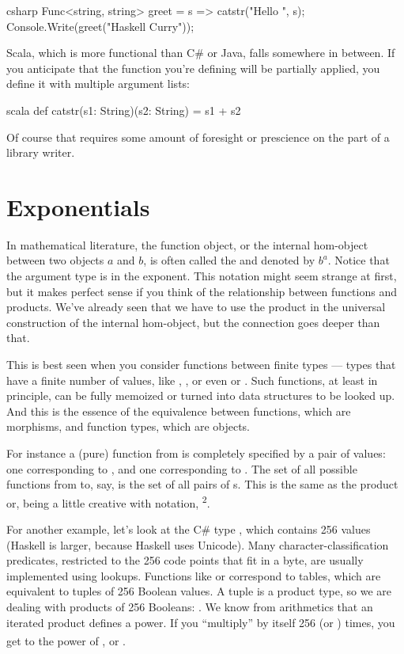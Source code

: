 \begin{snip}{csharp}
Func<string, string> greet = s => catstr("Hello ", s);
Console.Write(greet("Haskell Curry"));
\end{snip}
Scala, which is more functional than C\# or Java, falls somewhere in
between. If you anticipate that the function you're defining will be
partially applied, you define it with multiple argument lists:

\begin{snip}{scala}
def catstr(s1: String)(s2: String) = s1 + s2
\end{snip}
Of course that requires some amount of foresight or prescience on the
part of a library writer.

\section{Exponentials}

In mathematical literature, the function object, or the internal
hom-object between two objects $a$ and $b$, is often
called the  and denoted by $b^{a}$. Notice that
the argument type is in the exponent. This notation might seem strange
at first, but it makes perfect sense if you think of the relationship
between functions and products. We've already seen that we have to use
the product in the universal construction of the internal hom-object,
but the connection goes deeper than that.

This is best seen when you consider functions between finite types ---
types that have a finite number of values, like ,
, or even  or . Such functions,
at least in principle, can be fully memoized or turned into data
structures to be looked up. And this is the essence of the equivalence
between functions, which are morphisms, and function types, which are
objects.

For instance a (pure) function from  is completely
specified by a pair of values: one corresponding to , and
one corresponding to . The set of all possible functions
from  to, say,  is the set of all pairs of
s. This is the same as the product  \times{}  or,
being a little creative with notation, \textsuperscript{2}.

For another example, let's look at the C\# type , which
contains 256 values (Haskell  is larger, because Haskell
uses Unicode). Many character-classification predicates, restricted to
the 256 code points that fit in a byte, are usually implemented using
lookups. Functions like  or 
correspond to tables, which are equivalent to tuples of 256 Boolean
values. A
tuple is a product type, so we are dealing with products of 256
Booleans: . We know from
arithmetics that an iterated product defines a power. If you
``multiply''  by itself 256 (or ) times, you
get  to the power of , or \textsuperscript{}.

